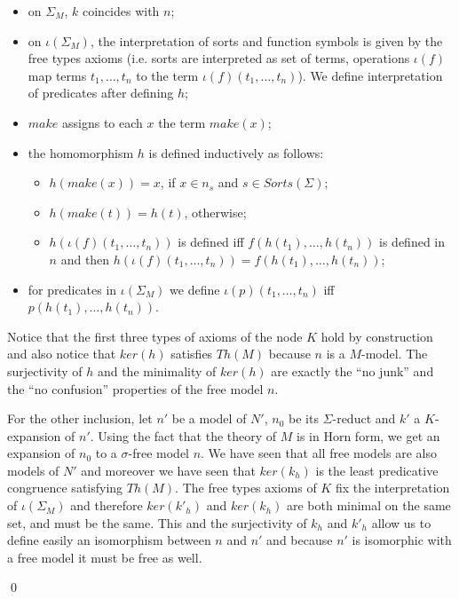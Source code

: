 \begin{itemize}

\item on $\Sigma_M$, $k$ coincides with $n$;

\item on $\iota(\Sigma_M)$, the interpretation of sorts and function symbols 
is given by the free types axioms (i.e. sorts are interpreted as set of terms, 
operations $\iota(f)$ map terms $t_1, \ldots, t_n$ to the term
$\iota(f)(t_1, \ldots, t_n)$).  We define interpretation of predicates after defining $h$;

\item $make$ assigns to each $x$ the term $make(x)$;

\item the homomorphism $h$ is defined inductively as follows:

 \begin{itemize}

  \item $h(\mathit{make}(x)) = x$, if $x \in n_s$ and $s\in \mathit{Sorts}(\Sigma)$;

 \item $h(\mathit{make}(t)) = h(t)$, otherwise;

 \item $h(\iota(f)(t_1, \dots, t_n))$ is defined iff $f(h(t_1), \ldots, h(t_n))$
       is defined in $n$
       and then  $h(\iota(f)(t_1, \ldots, t_n)) = f(h(t_1), \ldots, h(t_n))$;
 \end{itemize}

\item for predicates in $\iota(\Sigma_M)$ we define
         $\iota(p)(t_1, \ldots, t_n)$ iff $p(h(t_1), \ldots, h(t_n))$.

\end{itemize}

Notice that the first three types of axioms of the node $K$ hold by construction and also
notice that $ker(h)$ satisfies $Th(M)$ because $n$ is a $M$-model.
The surjectivity of $h$ and the minimality of $ker(h)$ are exactly the
``no junk'' and the ``no confusion'' properties of the free model $n$.  

For the other inclusion, let $n'$ be a model of $N'$, $n_0$ be its $\Sigma$-reduct and
$k'$ a $K$-expansion of $n'$.
Using the fact that the theory of $M$ is in Horn form, we get an expansion of $n_0$ to a
$\sigma$-free model $n$. We have seen that all free models are also models of $N'$ and moreover
we have seen that $ker(k_h)$ is the least predicative congruence satisfying $Th(M)$. The free types 
axioms of $K$ fix the interpretation of $\iota(\Sigma_M)$ and therefore $ker(k'_h)$ and
$ker(k_h)$ are both minimal on the same set, and must be the same. This and the surjectivity
of $k_h$ and $k'_h$ allow us to define easily
an isomorphism between $n$ and $n'$ and because $n'$ is isomorphic with a free model it must be free as well.

\qed





























